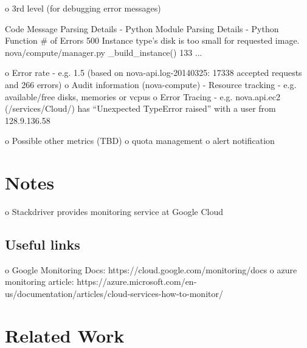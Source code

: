 \documentclass{sig-alternate-05-2015}
\begin{document}
o       3rd level (for debugging error messages)


Code    Message Parsing Details - Python Module Parsing Details - Python Function       \# of Errors
500     Instance type's disk is too small for requested image.  nova/compute/manager.py \_build\_instance()     133
...                             

o  Error rate
-       e.g. 1.5 %
(based on nova-api.log-20140325: 17338 accepted requests and 266 errors)
o  Audit information (nova-compute)
-       Resource tracking
-       e.g. available/free disks, memories or vcpus
o  Error Tracing
-       e.g. nova.api.ec2 (/services/Cloud/) has “Unexpected TypeError raised” with a user from 128.9.136.58

o  Possible other metrics (TBD)
o  quota management
o  alert notification

\section{Notes}

o  Stackdriver provides monitoring service at Google Cloud

\subsection{Useful links}

o  Google Monitoring Docs: https://cloud.google.com/monitoring/docs
o  azure monitoring article: https://azure.microsoft.com/en-us/documentation/articles/cloud-services-how-to-monitor/

\section{Related Work}
\end{document}
